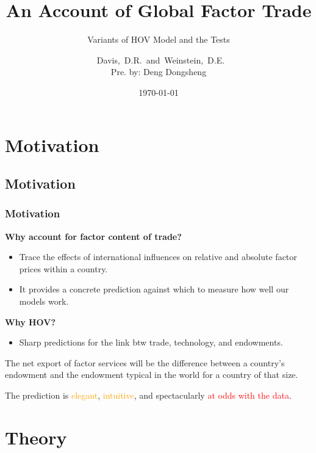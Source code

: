\documentclass[xcolor=svgnames,10pt]{beamer}
\title{An Account of Global Factor Trade}
\subtitle{Variants of HOV Model and the Tests}
\author{\mbox{\phantom{Pre. by: Dongsheng} Davis, D.R. and Weinstein, D.E.\phantom{Pre. by: Dongsheng}}\\ \vspace{1ex} Pre. by: Deng Dongsheng}
\institute{ School of Economics, Fudan University}
\date{\today}
\begin{document}
\begin{frame}[fragile]
\titlepage{}
\end{frame}
\clearpage

\section{Motivation}
\subsection{Motivation}
\begin{frame}[c]\frametitle{Motivation}
\textbf{Why account for factor content of trade?}
\begin{itemize}
    \item  Trace the effects of international influences on relative and absolute factor prices within a country.
    \item It provides a concrete prediction against which to measure how well
our models work.
\end{itemize}
\textbf{Why HOV?}
\begin{itemize}
    \item Sharp predictions for the link btw trade, technology, and endowments.
\end{itemize}
\begin{theorem}
 The net export of factor services will be the difference between a country\rq{}s endowment and the endowment typical in the world for a country of that size.
\end{theorem}

The prediction is \textcolor{orange}{elegant}, \textcolor{orange}{intuitive}, and spectacularly \textcolor{red}{at odds with the data}.

\end{frame}

\section{Theory}
\end{document}
